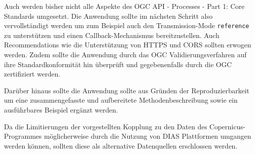 Auch werden bisher nicht alle Aspekte des OGC API - Processes - Part 1: Core Standards umgesetzt. Die Anwendung sollte im nächsten Schritt also 
vervollständigt werden um zum Beispiel auch den Transmission-Mode \verb|reference| zu unterstützen und einen Callback-Mechanismus bereitzustellen. 
Auch Recommendations wie die Unterstützung von HTTPS und CORS sollten erwogen werden.  
Zudem sollte die Anwendung durch das OGC Validierungsverfahren auf ihre Standardkonformität hin überprüft und gegebenenfalls durch die OGC zertifiziert werden. 

Darüber hinaus sollte die Anwendung sollte aus Gründen der Reproduzierbarkeit um eine zusammengefasste und aufbereitete Methodenbeschreibung sowie ein 
ausführbares Beispiel ergänzt werden.

Da die Limitierungen der vorgestellten Kopplung zu den Daten des Copernicus-Programmes möglicherweise durch die Nutzung von DIAS Plattformen umgangen werden können, sollten
diese als alternative Datenquellen erschlossen werden. 

